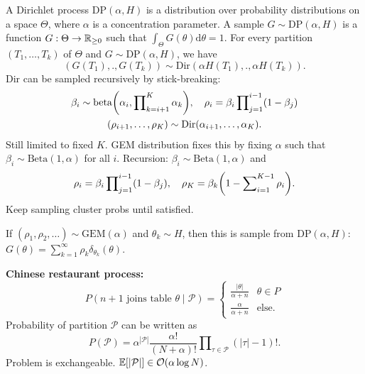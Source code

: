 \documentclass[9pt]{extarticle}
\newenvironment{topic}[1]
{\textbf{\sffamily \colorbox{black}{\rlap{\textbf{\textcolor{white}{#1}}}\hspace{\linewidth}\hspace{-2\fboxsep}}}}
{}
\newenvironment{subtopic}[1]
{\textbf{\sffamily #1:}}
{}
\begin{document}
\begin{multicols*}{3}
\begin{topic}{Non-parametric Bayesian methods}
        A Dirichlet process $\mathrm{DP}(\alpha, H)$ is a distribution over probability distributions on a
        space $\Theta$, where $\alpha$ is a concentration parameter. A sample $G \sim \mathrm{DP}(\alpha,
            H)$ is a function $G: \Theta \to \mathbb{R}_{\geq 0}$ such that $\int_{\Theta} G(\theta)\mathrm{d}\theta =
            1$. For every partition $(T_1, \ldots, T_k)$ of $\Theta$ and $G \sim \mathrm{DP}(\alpha, H)$, we
        have \[
            (G(T_1), ., G(T_k)) \sim \mathrm{Dir}(\alpha H(T_1), ., \alpha H(T_k)).
        \]
        Dir can be sampled recursively by stick-breaking:
        \begin{gather*}
            \beta_i \sim \mathrm{beta}\lft( \alpha_i, \prod\nolimits_{k=i+1}^K \alpha_k \rgt), \quad \rho_i = \beta_i \prod\nolimits_{j=1}^{i-1} (1-\beta_j) \\
            (\rho_{i+1}, \ldots, \rho_K) \sim \mathrm{Dir}(\alpha_{i+1}, \ldots, \alpha_K).
        \end{gather*}
        Still limited to fixed $K$. GEM distribution fixes this by fixing $\alpha$ such that
        $\beta_i \sim \mathrm{Beta}(1, \alpha)$ for all $i$. Recursion: $\beta_i \sim \mathrm{Beta}(1, \alpha)$ and \[
            \rho_i = \beta_i \prod\nolimits_{j=1}^{i-1} (1-\beta_j), \quad \rho_K = \beta_k \lft( 1- \sum\nolimits_{i=1}^{K-1} \rho_i \rgt).
        \]
        Keep sampling cluster probs until satisfied.

        If $(\rho_1, \rho_2, \ldots) \sim \mathrm{GEM}(\alpha)$ and $\theta_k \sim H$, then this is sample
        from $\mathrm{DP}(\alpha, H)$: $G(\theta) = \sum_{k=1}^{\infty} \rho_k \delta_{\theta_k}(\theta)$.

        \begin{subtopic}{Chinese restaurant process}
            \[
                P(\text{$n+1$ joins table $\theta$} \mid \mathcal{P}) = \begin{cases}
                    \frac{|\theta|}{\alpha+n} & \theta \in P \\
                    \frac{\alpha}{\alpha+n}   & \text{else}.
                \end{cases}
            \]
            Probability of partition $\mathcal{P}$ can be written as \[
                P(\mathcal{P}) = \alpha^{|\mathcal{P}|} \frac{\alpha!}{(N+\alpha)!} \prod\nolimits_{\tau \in \mathcal{P}} (|\tau| -1)!.
            \]
            Problem is exchangeable. $\E[|\mathcal{P}|] \in \bigo{\alpha \log N}$.

        \end{subtopic}


\end{topic}
\end{multicols*}
\end{document}
